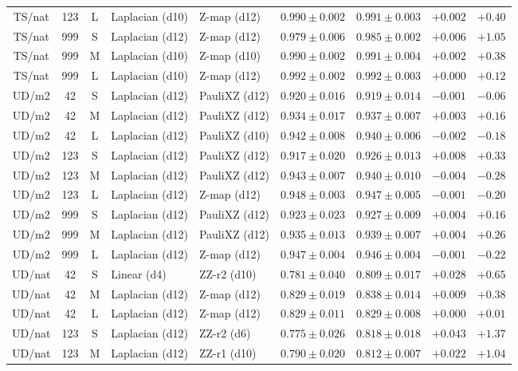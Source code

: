 \documentclass[journal]{IEEEtran}
\begin{document}
\begin{table}[!t]
\begin{tabular}{@{}ccc ll cc rr@{}}
TS/nat & 123 & L & Laplacian (d10) & Z-map (d12) & $0.990\pm0.002$ & $0.991\pm0.003$ & $+0.002$ & $+0.40$ \\
TS/nat & 999 & S & Laplacian (d12) & Z-map (d12) & $0.979\pm0.006$ & $0.985\pm0.002$ & $+0.006$ & $+1.05$ \\
TS/nat & 999 & M & Laplacian (d10) & Z-map (d10) & $0.990\pm0.002$ & $0.991\pm0.004$ & $+0.002$ & $+0.38$ \\
TS/nat & 999 & L & Laplacian (d10) & Z-map (d12) & $0.992\pm0.002$ & $0.992\pm0.003$ & $+0.000$ & $+0.12$ \\
UD/m2 & 42 & S & Laplacian (d12) & PauliXZ (d12) & $0.920\pm0.016$ & $0.919\pm0.014$ & $-0.001$ & $-0.06$ \\
UD/m2 & 42 & M & Laplacian (d12) & PauliXZ (d12) & $0.934\pm0.017$ & $0.937\pm0.007$ & $+0.003$ & $+0.16$ \\
UD/m2 & 42 & L & Laplacian (d12) & PauliXZ (d10) & $0.942\pm0.008$ & $0.940\pm0.006$ & $-0.002$ & $-0.18$ \\
UD/m2 & 123 & S & Laplacian (d12) & PauliXZ (d12) & $0.917\pm0.020$ & $0.926\pm0.013$ & $+0.008$ & $+0.33$ \\
UD/m2 & 123 & M & Laplacian (d12) & PauliXZ (d12) & $0.943\pm0.007$ & $0.940\pm0.010$ & $-0.004$ & $-0.28$ \\
UD/m2 & 123 & L & Laplacian (d12) & Z-map (d12) & $0.948\pm0.003$ & $0.947\pm0.005$ & $-0.001$ & $-0.20$ \\
UD/m2 & 999 & S & Laplacian (d12) & PauliXZ (d12) & $0.923\pm0.023$ & $0.927\pm0.009$ & $+0.004$ & $+0.16$ \\
UD/m2 & 999 & M & Laplacian (d12) & PauliXZ (d12) & $0.935\pm0.013$ & $0.939\pm0.007$ & $+0.004$ & $+0.26$ \\
UD/m2 & 999 & L & Laplacian (d12) & Z-map (d12) & $0.947\pm0.004$ & $0.946\pm0.004$ & $-0.001$ & $-0.22$ \\
UD/nat & 42 & S & Linear (d4) & ZZ-r2 (d10) & $0.781\pm0.040$ & $0.809\pm0.017$ & $+0.028$ & $+0.65$ \\
UD/nat & 42 & M & Laplacian (d12) & Z-map (d12) & $0.829\pm0.019$ & $0.838\pm0.014$ & $+0.009$ & $+0.38$ \\
UD/nat & 42 & L & Laplacian (d12) & Z-map (d12) & $0.829\pm0.011$ & $0.829\pm0.008$ & $+0.000$ & $+0.01$ \\
UD/nat & 123 & S & Laplacian (d12) & ZZ-r2 (d6) & $0.775\pm0.026$ & $0.818\pm0.018$ & $+0.043$ & $+1.37$ \\
UD/nat & 123 & M & Laplacian (d12) & ZZ-r1 (d10) & $0.790\pm0.020$ & $0.812\pm0.007$ & $+0.022$ & $+1.04$ \\

\end{tabular}
\end{table}
\end{document}
